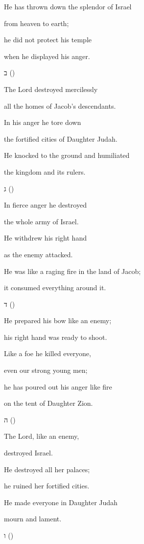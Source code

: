 {\par }{\Q He has thrown
down the
splendor of
Israel
\par }{\Q from
heaven to
earth;
\par }{\Q he did
not
protect his temple
\par }{\Q when he displayed his anger.
\par }{\SH ב ({})
\par }{\Q {}The Lord destroyed mercilessly
\par }{\Q all the homes of Jacob’s descendants.
\par }{\Q In his anger he tore down
\par }{\Q the fortified cities of Daughter Judah.
\par }{\Q He knocked to the ground and humiliated
\par }{\Q the kingdom and its rulers.
\par }{\SH ג ({})
\par }{\Q {}In fierce anger he destroyed
\par }{\Q the whole army of Israel.
\par }{\Q He withdrew his right hand
\par }{\Q as the enemy attacked.
\par }{\Q He was like a raging fire in the land of Jacob;
\par }{\Q it consumed everything around it.
\par }{\SH ד ({})
\par }{\Q {}He prepared his bow like an enemy;
\par }{\Q his right hand was ready to shoot.
\par }{\Q Like a foe he killed everyone,
\par }{\Q even our strong young men;
\par }{\Q he has poured out his anger like fire
\par }{\Q on the tent of Daughter Zion.
\par }{\SH ה ({})
\par }{\Q {}The Lord, like an enemy,
\par }{\Q destroyed Israel.
\par }{\Q He destroyed all her palaces;
\par }{\Q he ruined her fortified cities.
\par }{\Q He made everyone in Daughter Judah
\par }{\Q mourn and lament.
\par }{\SH ו ({})
}

